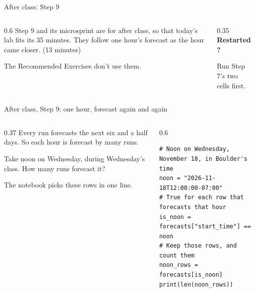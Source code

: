 \documentclass[9pt,aspectratio=169]{beamer}
\begin{document}
\begin{frame}{After class: Step 9}
    \begin{columns}[T]
        \begin{column}{0.6\textwidth}
            Step 9 and its microsprint are for after class, so that today's lab fits its 35 minutes. They follow one hour's forecast as the hour came closer. (13 minutes)
            \medskip

            The Recommended Exercises don't use them.
        \end{column}
        \begin{column}{0.35\textwidth}
            \textbf{Restarted?}\\[2pt]
            {\footnotesize Run Step 7's two cells first.\par}
        \end{column}
    \end{columns}
\end{frame}

\begin{frame}[fragile]{After class, Step 9: one hour, forecast again and again}
    \begin{columns}[T]
        \begin{column}{0.37\textwidth}
            Every run forecasts the next six and a half days. So each hour is forecast by many runs.

            \medskip
            Take noon on Wednesday, during Wednesday's class. How many runs forecast it?

            \medskip
            The notebook picks these rows in one line.
        \end{column}
        \begin{column}{0.6\textwidth}
\begin{lstlisting}
# Noon on Wednesday, November 18, in Boulder's time
noon = "2026-11-18T12:00:00-07:00"
# True for each row that forecasts that hour
is_noon = forecasts["start_time"] == noon
# Keep those rows, and count them
noon_rows = forecasts[is_noon]
print(len(noon_rows))
\end{lstlisting}
        \end{column}
    \end{columns}
\end{frame}
\end{document}
